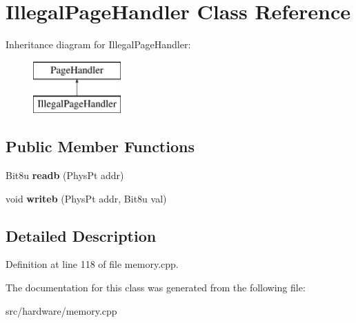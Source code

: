 \hypertarget{classIllegalPageHandler}{\section{Illegal\-Page\-Handler Class Reference}
\label{classIllegalPageHandler}
}
Inheritance diagram for Illegal\-Page\-Handler\-:\begin{figure}[H]
\begin{center}
\leavevmode
\includegraphics[height=2.000000cm]{classIllegalPageHandler}
\end{center}
\end{figure}
\subsection*{Public Member Functions}
\begin{DoxyCompactItemize}
\item 
\hypertarget{classIllegalPageHandler_a4a2a69ab53eed1af39810fe0c83aa130}{Bit8u {\bfseries readb} (Phys\-Pt addr)}\label{classIllegalPageHandler_a4a2a69ab53eed1af39810fe0c83aa130}

\item 
\hypertarget{classIllegalPageHandler_a4c0feeacf35dc15170542bd505524a25}{void {\bfseries writeb} (Phys\-Pt addr, Bit8u val)}\label{classIllegalPageHandler_a4c0feeacf35dc15170542bd505524a25}

\end{DoxyCompactItemize}


\subsection{Detailed Description}


Definition at line 118 of file memory.\-cpp.



The documentation for this class was generated from the following file\-:\begin{DoxyCompactItemize}
\item 
src/hardware/memory.\-cpp\end{DoxyCompactItemize}
